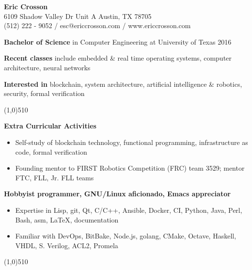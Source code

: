 \documentclass{report}
\newcommand{\cut}{\begin{center} \line(1,0){510} \end{center}}
\begin{document}
\pagestyle{empty}
\setlength\parindent{0pt}

\begin{center}
  \textbf{Eric Crosson} \\
  6109 Shadow Valley Dr Unit A Austin, TX 78705 \\
  (512) 222 - 9052 / esc@ericcrosson.com / www.ericcrosson.com
\end{center}

\textbf{Bachelor of Science} in Computer Engineering at University of Texas
2016

\vspace{1mm}

\textbf{Recent classes} include embedded \& real time operating systems,
computer architecture, neural networks

\vspace{1mm}

\textbf{Interested in} blockchain, system architecture, artificial intelligence \& robotics, security, formal verification

\cut{}

\textbf{Extra Curricular Activities}
\begin{itemize}[label=$\circ$]
\item Self-study of blockchain technology, functional programming, infrastructure as code, formal
  verification
\item Founding mentor to FIRST Robotics Competition (FRC) team 3529; mentor FTC,
  FLL, Jr. FLL teams
\end{itemize}

\textbf{Hobbyist programmer, GNU/Linux aficionado, Emacs appreciator}
\begin{itemize}[label=$\circ$]
\item Expertise in Lisp, git, Qt, C/C++, Ansible, Docker, CI, Python, Java, Perl, Bash, asm,
  \LaTeX{}, documentation
\item Familiar with DevOps, BitBake, Node.js, golang, CMake, Octave, Haskell, VHDL, S. Verilog, ACL2, Promela
\end{itemize}

\cut{}
\end{document}
